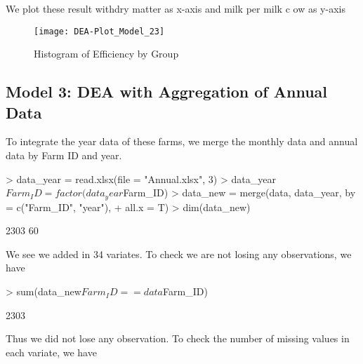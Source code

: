 \documentclass[12pt,]{article}
\begin{document}
We plot these result withdry matter as x-axis and milk per milk c ow as y-axis
\begin{figure}[h]
\begin{Schunk}
\end{Schunk}
\texttt{[image: DEA-Plot\_Model\_23]}
\caption{Histogram of Efficiency by Group}
\end{figure}

\subsection{Model 3: DEA with Aggregation of Annual Data}
To integrate the year data of these farms, we merge the monthly data and annual data by Farm ID and year.
\begin{Schunk}
\begin{Sinput}
> data_year = read.xlsx(file = "Annual.xlsx", 3)
> data_year$Farm_ID = factor(data_year$Farm_ID)
> data_new = merge(data, data_year, by = c("Farm_ID", "year"),
+                  all.x = T)
> dim(data_new)
\end{Sinput}
\begin{Soutput}
[1] 2303   60
\end{Soutput}
\end{Schunk}
We see we added in 34 variates. To check we are not losing any observations, we have
\begin{Schunk}
\begin{Sinput}
> sum(data_new$Farm_ID == data$Farm_ID)
\end{Sinput}
\begin{Soutput}
[1] 2303
\end{Soutput}
\end{Schunk}
Thus we did not lose any observation. To check the number of missing values in each variate, we have
\end{document}
